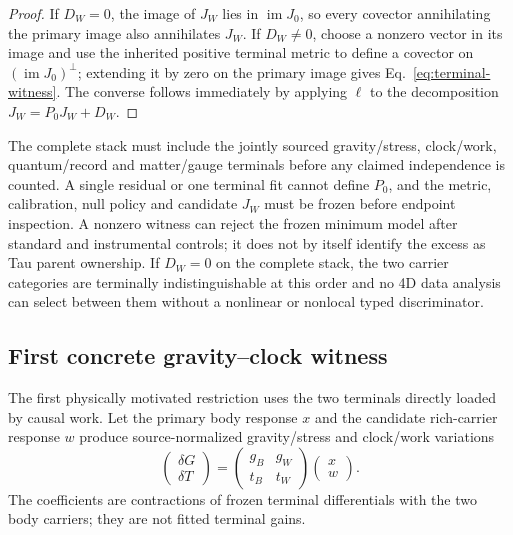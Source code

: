 \documentclass[11pt]{article}
\begin{document}
\begin{proof}
If \(D_W=0\), the image of \(J_W\) lies in \(\operatorname{im}J_0\), so
every covector annihilating the primary image also annihilates \(J_W\). If
\(D_W\ne0\), choose a nonzero vector in its image and use the inherited
positive terminal metric to define a covector on
\((\operatorname{im}J_0)^\perp\); extending it by zero on the primary image
gives Eq.~\eqref{eq:terminal-witness}. The converse follows immediately by
applying \(\ell\) to the decomposition \(J_W=P_0J_W+D_W\).
\end{proof}

The complete stack must include the jointly sourced gravity/stress,
clock/work, quantum/record and matter/gauge terminals before any claimed
independence is counted. A single residual or one terminal fit cannot define
\(P_0\), and the metric, calibration, null policy and candidate \(J_W\) must
be frozen before endpoint inspection. A nonzero witness can reject the frozen
minimum model after standard and instrumental controls; it does not by itself
identify the excess as Tau parent ownership. If \(D_W=0\) on the complete
stack, the two carrier categories are terminally indistinguishable at this
order and no 4D data analysis can select between them without a nonlinear or
nonlocal typed discriminator.

\subsection{First concrete gravity--clock witness}

The first physically motivated restriction uses the two terminals directly
loaded by causal work. Let the primary body response \(x\) and the candidate
rich-carrier response \(w\) produce source-normalized gravity/stress and
clock/work variations
\begin{equation}
 \begin{pmatrix}\delta G\\ \delta T\end{pmatrix}
 =
 \begin{pmatrix}g_B&g_W\\ t_B&t_W\end{pmatrix}
 \begin{pmatrix}x\\w\end{pmatrix}.
 \label{eq:gravity-clock-jacobian}
\end{equation}
The coefficients are contractions of frozen terminal differentials with the
two body carriers; they are not fitted terminal gains.
\end{document}
